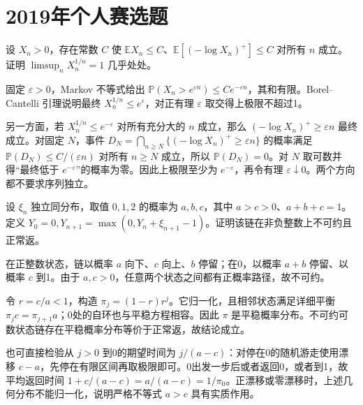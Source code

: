 \documentclass[UTF8,12pt,a4paper,fontset=fandol]{ctexbook}
\newcommand{\E}{\mathbb E}
\newcommand{\PP}{\mathbb P}
\begin{document}
\section{2019年个人赛选题}
\begin{example}[原题1：正随机变量的根上极限]\label{yau:2019-1}
设 $X_n>0$，存在常数 $C$ 使 $\E X_n\le C$、$\E[(-\log X_n)^+]\le C$ 对所有 $n$ 成立。证明 $\limsup_nX_n^{1/n}=1$ 几乎处处。
\end{example}
\begin{solve}
固定 $\varepsilon>0$，Markov 不等式给出 $\PP(X_n>e^{\varepsilon n})\le Ce^{-\varepsilon n}$，其和有限。Borel--Cantelli 引理说明最终 $X_n^{1/n}\le e^\varepsilon$，对正有理 $\varepsilon$ 取交得上极限不超过1。

另一方面，若 $X_n^{1/n}\le e^{-\varepsilon}$ 对所有充分大的 $n$ 成立，那么 $(-\log X_n)^+\ge\varepsilon n$ 最终成立。对固定 $N$，事件 $D_N=\bigcap_{n\ge N}\{(-\log X_n)^+\ge\varepsilon n\}$ 的概率满足 $\PP(D_N)\le C/(\varepsilon n)$ 对所有 $n\ge N$ 成立，所以 $\PP(D_N)=0$。对 $N$ 取可数并得“最终低于 $e^{-\varepsilon}$”的概率为零。因此上极限至少为 $e^{-\varepsilon}$，再令有理 $\varepsilon\downarrow0$。两个方向都不要求序列独立。
\end{solve}

\begin{example}[原题2：反射随机游走的正常返性]\label{yau:2019-2}
设 $\xi_n$ 独立同分布，取值 $0,1,2$ 的概率为 $a,b,c$，其中 $a>c>0$、$a+b+c=1$。定义 $Y_0=0,Y_{n+1}=\max(0,Y_n+\xi_{n+1}-1)$。证明该链在非负整数上不可约且正常返。
\end{example}
\begin{solve}
在正整数状态，链以概率 $a$ 向下、$c$ 向上、$b$ 停留；在0，以概率 $a+b$ 停留、以概率 $c$ 到1。由于 $a,c>0$，任意两个状态之间都有正概率路径，故不可约。

令 $r=c/a<1$，构造 $\pi_j=(1-r)r^j$。它归一化，且相邻状态满足详细平衡 $\pi_jc=\pi_{j+1}a$；0处的自环也与平稳方程相容。因此 $\pi$ 是平稳概率分布。不可约可数状态链存在平稳概率分布等价于正常返，故结论成立。

也可直接检验从 $j>0$ 到0的期望时间为 $j/(a-c)$：对停在0的随机游走使用漂移 $c-a$，先停在有限区间再取极限即可。0出发一步后或者返回0，或者到1，故平均返回时间 $1+c/(a-c)=a/(a-c)=1/\pi_0$。正漂移或零漂移时，上述几何分布不能归一化，说明严格不等式 $a>c$ 具有实质作用。
\end{solve}
\end{document}
